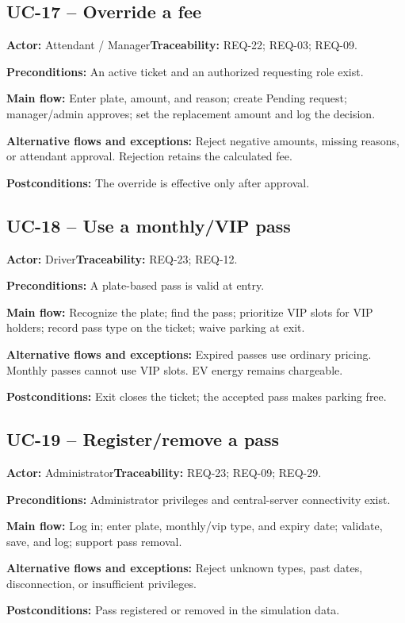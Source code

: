\subsection{UC-17 -- Override a fee}
\noindent\textbf{Actor:} Attendant / Manager\quad\textbf{Traceability:} REQ-22; REQ-03; REQ-09.
\par\textbf{Preconditions:} An active ticket and an authorized requesting role exist.
\par\textbf{Main flow:} Enter plate, amount, and reason; create Pending request; manager/admin approves; set the replacement amount and log the decision.
\par\textbf{Alternative flows and exceptions:} Reject negative amounts, missing reasons, or attendant approval. Rejection retains the calculated fee.
\par\textbf{Postconditions:} The override is effective only after approval.
\subsection{UC-18 -- Use a monthly/VIP pass}
\noindent\textbf{Actor:} Driver\quad\textbf{Traceability:} REQ-23; REQ-12.
\par\textbf{Preconditions:} A plate-based pass is valid at entry.
\par\textbf{Main flow:} Recognize the plate; find the pass; prioritize VIP slots for VIP holders; record pass type on the ticket; waive parking at exit.
\par\textbf{Alternative flows and exceptions:} Expired passes use ordinary pricing. Monthly passes cannot use VIP slots. EV energy remains chargeable.
\par\textbf{Postconditions:} Exit closes the ticket; the accepted pass makes parking free.
\subsection{UC-19 -- Register/remove a pass}
\noindent\textbf{Actor:} Administrator\quad\textbf{Traceability:} REQ-23; REQ-09; REQ-29.
\par\textbf{Preconditions:} Administrator privileges and central-server connectivity exist.
\par\textbf{Main flow:} Log in; enter plate, monthly/vip type, and expiry date; validate, save, and log; support pass removal.
\par\textbf{Alternative flows and exceptions:} Reject unknown types, past dates, disconnection, or insufficient privileges.
\par\textbf{Postconditions:} Pass registered or removed in the simulation data.
